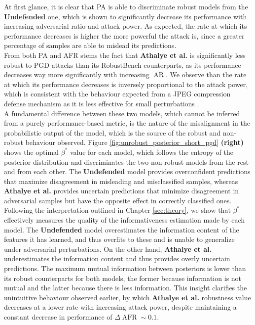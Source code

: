 At first glance, it is clear that PA is able to discriminate robust models from
the {\color{tab:orange} \textbf{Undefended}} one, which is shown to significantly
decrease its performance with increasing adversarial ratio and attack power. As expected, 
the rate at which its performance decreases is higher
the more powerful the attack is, since a greater percentage of samples are able to
mislead its predictions. \\

From both PA and AFR stems the fact that {\color{tab:green} \textbf{Athalye et al.}}
is significantly less robust to PGD attacks than its RobustBench counterparts, as 
its performance decreases way more significantly with increasing $\operatorname{AR}$. 
We observe than the rate at which its performance decreases is inversely proportional to the 
attack power, which is consistent with the behaviour expected from a JPEG compression defense 
mechanism as it is less effective for small perturbations \cite{dasKeepingBadGuys2017}. \\

A fundamental difference between these two models, which cannot be
inferred from a purely performance-based metric, is the nature of the misalignment in
the probabilistic output of the model, which is the source of the robust and non-robust
behaviour observed. Figure \ref{fig:unrobust_posterior_short_pgd} \textbf{(right)}
shows the optimal $\beta^{*}$ value for each model, which follows
the entropy of the posterior distribution and discriminates the two non-robust
models from the rest and from each other. The {\color{tab:orange} \textbf{Undefended}}
model provides overconfident predictions that maximize disagreement in misleading and 
misclassified samples, whereas {\color{tab:green} \textbf{Athalye et al.}} provides 
uncertain predictions that minimize disagreement in adversarial samples but have 
the opposite effect in correctly classified ones. \\

Following the interpretation outlined in Chapter \ref{sec:theory}, we show that $\beta^{*}$ effectively measures the quality of 
the informativeness estimation made by each model. The {\color{tab:orange} \textbf{Undefended}} 
model overestimates the information content of the features it has learned, and thus overfits 
to these and is unable to generalize under adversarial perturbations. On the other hand, 
{\color{tab:green} \textbf{Athalye et al.}} underestimates the information content and thus
provides overly uncertain predictions. The maximum mutual information between posteriors is 
lower than its robust counterparts for both models, the former because information is not 
mutual and the latter because there is less information.
This insight clarifies the unintuitive behaviour observed earlier, by which {\color{tab:green} \textbf{Athalye et al.}} 
robustness value decreases at a lower rate with increasing attack power, despite maintaining a
constant decrease in performance of $\Delta \operatorname{AFR} \sim 0.1$. \\

